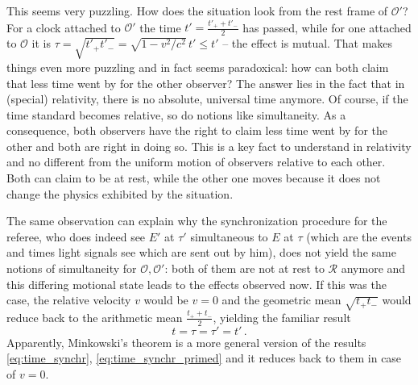 This seems very puzzling. How does the situation look from the rest frame of $\mathcal{O}'$? For a clock attached to $\mathcal{O}'$ the time $t' = \frac{t'_+ + t'_-}{2}$ has passed, while for one attached to $\mathcal{O}$ it is $\tau = \sqrt{t'_+ t'_-} = \sqrt{1 - v^2 / c^2} \, t' \leq t'$ -- the effect is mutual. That makes things even more puzzling and in fact seems paradoxical: how can both claim that less time went by for the other observer? The answer lies in the fact that in (special) relativity, there is no absolute, universal time anymore. Of course, if the time standard becomes relative, so do notions like simultaneity. As a consequence, both observers have the right to claim less time went by for the other and both are right in doing so. This is a key fact to understand in relativity and no different from the uniform motion of observers relative to each other. Both can claim to be at rest, while the other one moves because it does not change the physics exhibited by the situation.


The same observation can explain why the synchronization procedure for the referee, who does indeed see $E'$ at $\tau'$ simultaneous to $E$ at $\tau$ (which are the events and times light signals see which are sent out by him), does not yield the same notions of simultaneity for $\mathcal{O}, \mathcal{O}'$: both of them are not at rest to $\mathcal{R}$ anymore and this differing motional state leads to the effects observed now. If this was the case, the relative velocity $v$ would be $v = 0$ and the geometric mean $\sqrt{t_+ t_-}$ would reduce back to the arithmetic mean $\frac{t_+ + t_-}{2}$, yielding the familiar result
\begin{equation}
t = \tau = \tau' = t' \, .
\end{equation}
Apparently, Minkowski's theorem is a more general version of the results \eqref{eq:time_synchr}, \eqref{eq:time_synchr_primed} and it reduces back to them in case of $v = 0$.






